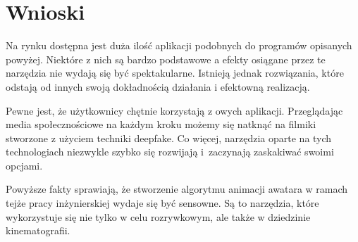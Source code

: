 
\section{Wnioski}
Na rynku dostępna jest duża ilość aplikacji podobnych do programów opisanych powyżej. Niektóre z nich są bardzo podstawowe a efekty osiągane przez te narzędzia nie wydają się być spektakularne. Istnieją jednak rozwiązania, które odstają od innych swoją dokładnością działania i efektowną realizacją. 

Pewne jest, że użytkownicy chętnie korzystają z owych aplikacji. Przeglądając media społecznościowe na każdym kroku możemy się natknąć na filmiki stworzone z użyciem techniki deepfake. Co więcej, narzędzia oparte na tych technologiach niezwykle szybko się rozwijają i~zaczynają zaskakiwać swoimi opcjami.

Powyższe fakty sprawiają, że stworzenie algorytmu animacji awatara w ramach tejże pracy inżynierskiej wydaje się być sensowne. Są to narzędzia, które wykorzystuje się nie tylko w celu rozrywkowym, ale także w dziedzinie kinematografii. 


